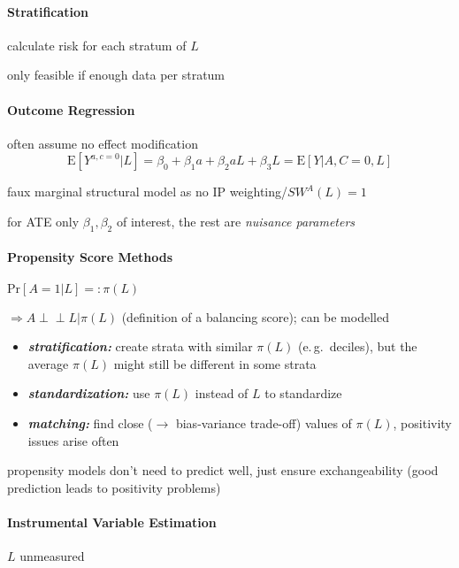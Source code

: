 \documentclass[8pt,twoside]{extarticle}
\newcommand{\indep}{\perp \!\!\! \perp}
\begin{document}
\begin{multicols}{2}




\paragraph{Stratification}  calculate risk for each stratum of $L$

\noindent only feasible if enough data per stratum


\paragraph{Outcome Regression} often assume no effect modification
$$\mathrm{E}\left[Y^{a,c=0}|L\right] = \beta_0 + \beta_1 a + \beta_2 aL +\beta_3 L = \mathrm{E}\left[Y|A, C=0, L\right]$$

\noindent faux marginal structural model as no IP weighting/$SW^A(L)=1$

\noindent for ATE only $\beta_1,\beta_2$ of interest, the rest are \textit{nuisance parameters}

\paragraph{Propensity Score Methods}
$\mathrm{Pr}\left[A=1|L\right] =: \pi(L)$ 
 
\noindent  $\Rightarrow A\indep L|\pi(L)$ (definition of a  balancing score); can be modelled  


\begin{itemize}[itemsep=0em, topsep=0pt, partopsep=0pt,parsep=0pt, leftmargin=1.5em]
\setlength{\itemsep}{0pt}%
\setlength{\parskip}{0pt}
\item \textit{\textbf{stratification:}} create strata with similar $\pi(L)$ (e.\,g.\ deciles), but the average $\pi(L)$ might still be different in some strata
\item \textit{\textbf{standardization:}} use $\pi(L)$ instead of $L$ to standardize
\item \textit{\textbf{matching:}} find close ($\rightarrow$ bias-variance trade-off) values of $\pi(L)$, positivity issues arise often
\end{itemize}

\noindent propensity models don't need to predict well, just ensure exchangeability (good prediction leads to positivity problems)


\paragraph{Instrumental Variable Estimation} $L$ unmeasured


\end{multicols}
\end{document}
